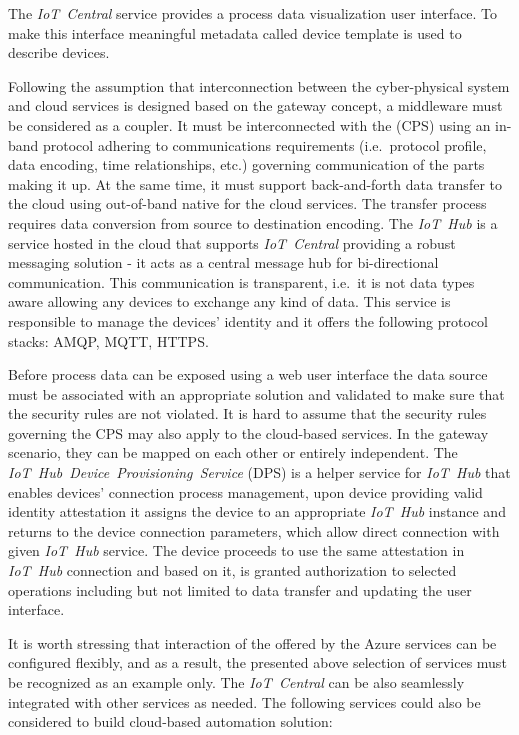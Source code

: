 \documentclass{jacsart}
\begin{document}
The \textit{IoT\ Central} service provides a process data visualization
user interface. To make this interface meaningful metadata called device
template is used to describe devices.

Following the assumption that interconnection between the cyber-physical
system and cloud services is designed based on the gateway concept, a
middleware must be considered as a coupler. It must be interconnected
with the (CPS) using an in-band protocol adhering to
communications requirements (i.e.~protocol profile, data encoding, time
relationships, etc.) governing communication of the parts making it up.
At the same time, it must support back-and-forth data transfer to the
cloud using out-of-band native for the cloud services. The transfer
process requires data conversion from source to destination encoding.
The \textit{IoT\ Hub} is a service hosted in the cloud that supports
\textit{IoT\ Central} providing a robust messaging solution - it acts as
a central message hub for bi-directional communication. This
communication is transparent, i.e.~it is not data types aware allowing
any devices to exchange any kind of data. This service is responsible to
manage the devices' identity and it offers the following protocol
stacks: AMQP, MQTT, HTTPS.

Before process data can be exposed using a web user interface the data source must be associated with an appropriate solution and validated to make sure that the security rules are not violated. It is hard to assume that the security rules governing the CPS may also apply to the cloud-based services. In the gateway scenario, they can be mapped on each other or entirely independent. The \textit{IoT\ Hub\ Device\ Provisioning\ Service} (DPS) is a helper service for \textit{IoT\ Hub} that enables devices' connection process management, upon device providing valid identity attestation it assigns the device to an appropriate \textit{IoT\ Hub} instance and returns to the device connection parameters, which allow direct connection with given \textit{IoT\ Hub} service. The device proceeds to use the same attestation in \textit{IoT\ Hub} connection and based on it, is granted authorization to selected operations including but not limited to data transfer and updating the user interface.

It is worth stressing that interaction of the offered by the Azure
services can be configured flexibly, and as a result, the presented
above selection of services must be recognized as an example only. The
\textit{IoT\ Central} can be also seamlessly integrated with other
services as needed. The following services could also be considered to
build cloud-based automation solution:
\end{document}
